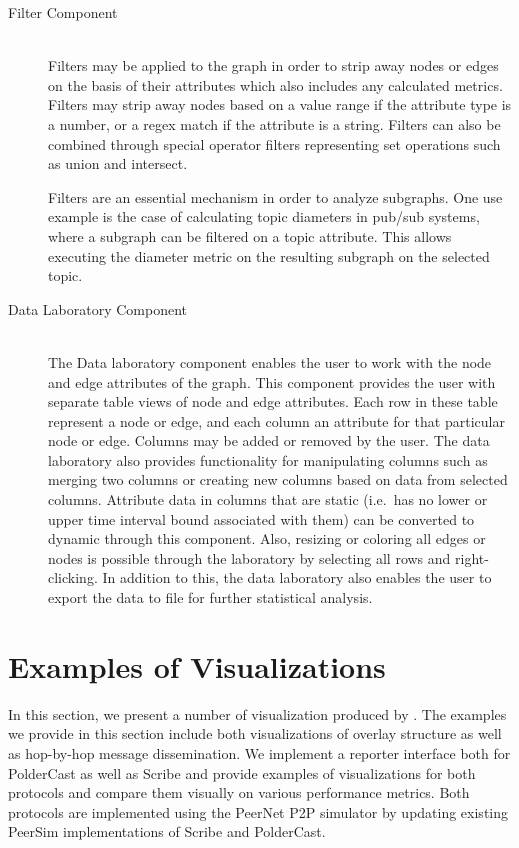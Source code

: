 \begin{description}
\item[Filter Component] \hfill \\

    Filters may be applied to the graph in order to strip away nodes or
    edges on the basis of their attributes which also includes any
    calculated metrics. Filters may strip away nodes based on a value range if
    the attribute type is a number, or a regex match if the attribute is
    a string. Filters can also be combined through special operator filters
    representing set operations such as union and intersect.

    Filters are an essential mechanism in order to analyze subgraphs.
    One use example is the case of calculating topic diameters in pub/sub systems,
    where a subgraph can be filtered on a topic attribute. This
    allows executing the diameter metric on the resulting subgraph
    on the selected topic.

\item[Data Laboratory Component] \hfill \\

    The Data laboratory component enables the user to work with the node
    and edge attributes of the graph. This component provides the user
    with separate table views of node and edge attributes. Each row in
    these table represent a node or edge, and each column an attribute
    for that particular node or edge. Columns may be added or removed by
    the user. The data laboratory also provides functionality for
    manipulating columns such as merging two columns or creating new
    columns based on data from selected columns. Attribute data in
    columns that are static (i.e.\ has no lower or upper time interval
    bound associated with them) can be converted to dynamic through this
    component. Also, resizing or coloring all edges or nodes is possible
    through the laboratory by selecting all rows and right-clicking. In
    addition to this, the data laboratory also enables the user to export the
    data to file for further statistical analysis.

\end{description}

\section{Examples of Visualizations}

In this section, we present a number of visualization produced by \demo.
The examples we provide in this section include both visualizations of
overlay structure as well as hop-by-hop message dissemination.  We
implement a reporter interface both for PolderCast as well as Scribe and
provide examples of visualizations for both protocols and compare them
visually on various performance metrics. Both protocols are implemented
using the PeerNet P2P simulator by updating existing PeerSim
implementations of Scribe and PolderCast.

